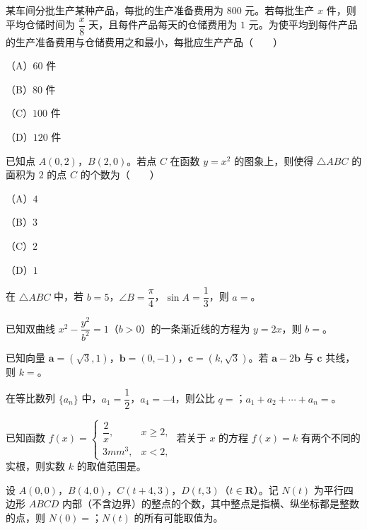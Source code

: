 \begin{question}
某车间分批生产某种产品，每批的生产准备费用为 $800$ 元。若每批生产 $x$ 件，则平均仓储时间为 $\dfrac x8$ 天，且每件产品每天的仓储费用为 $1$ 元。为使平均到每件产品的生产准备费用与仓储费用之和最小，每批应生产产品\mbox{（　　）}

（A）$60$ 件

（B）$80$ 件

（C）$100$ 件

（D）$120$ 件

\end{question}
\begin{question}
已知点 $A(0,2)$，$B(2,0)$。若点 $C$ 在函数 $y=x^2$ 的图象上，则使得 $\triangle ABC$ 的面积为 $2$ 的点 $C$ 的个数为\mbox{（　　）}

（A）$4$

（B）$3$

（C）$2$

（D）$1$

\end{question}

\begin{question}
在 $\triangle ABC$ 中，若 $b=5$，$\angle B=\dfrac{\pi}{4}$，$\sin A=\dfrac13$，则 $a=$\gkblank{}。

\end{question}
\begin{question}
已知双曲线 $x^2-\dfrac{y^2}{b^2}=1$（$b>0$）的一条渐近线的方程为 $y=2x$，则 $b=$\gkblank{}。

\end{question}
\begin{question}
已知向量 $\boldsymbol a=(\sqrt3,1)$，$\boldsymbol b=(0,-1)$，$\boldsymbol c=(k,\sqrt3)$。若 $\boldsymbol a-2\boldsymbol b$ 与 $\boldsymbol c$ 共线，则 $k=$\gkblank{}。

\end{question}
\begin{question}
在等比数列 $\{a_n\}$ 中，$a_1=\dfrac12$，$a_4=-4$，则公比 $q=$\gkblank{}；$a_1+a_2+\cdots+a_n=$\gkblank{}。

\end{question}
\begin{question}
已知函数 $f(x)=\begin{cases}\dfrac2x,&x\geqslant 2,\\3mm^3,&x<2,\end{cases}$ 若关于 $x$ 的方程 $f(x)=k$ 有两个不同的实根，则实数 $k$ 的取值范围是\gkblank{}。

\end{question}
\begin{question}
设 $A(0,0)$，$B(4,0)$，$C(t+4,3)$，$D(t,3)$（$t\in\mathbf R$）。记 $N(t)$ 为平行四边形 $ABCD$ 内部（不含边界）的整点的个数，其中整点是指横、纵坐标都是整数的点，则 $N(0)=$\gkblank{}；$N(t)$ 的所有可能取值为\gkblank{}。

\end{question}

